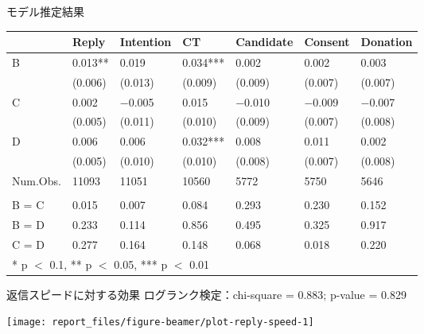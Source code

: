 \documentclass[
      aspectratio=169,
        12pt,
    ]{beamer}
\begin{document}
\begin{frame}{モデル推定結果}
\protect\hypertarget{ux30e2ux30c7ux30ebux63a8ux5b9aux7d50ux679c}{}
\begin{table}
\centering
\fontsize{9}{11}\selectfont
\begin{tabular}[t]{l>{\centering\arraybackslash}p{5em}>{\centering\arraybackslash}p{5em}>{\centering\arraybackslash}p{5em}>{\centering\arraybackslash}p{5em}>{\centering\arraybackslash}p{5em}>{\centering\arraybackslash}p{5em}}
\toprule
  & Reply & Intention & CT & Candidate & Consent & Donation\\
\midrule
B & \num{0.013}** & \num{0.019} & \num{0.034}*** & \num{0.002} & \num{0.002} & \num{0.003}\\
 & (\num{0.006}) & (\num{0.013}) & (\num{0.009}) & (\num{0.009}) & (\num{0.007}) & (\num{0.007})\\
C & \num{0.002} & \num{-0.005} & \num{0.015} & \num{-0.010} & \num{-0.009} & \num{-0.007}\\
 & (\num{0.005}) & (\num{0.011}) & (\num{0.010}) & (\num{0.009}) & (\num{0.007}) & (\num{0.008})\\
D & \num{0.006} & \num{0.006} & \num{0.032}*** & \num{0.008} & \num{0.011} & \num{0.002}\\
 & (\num{0.005}) & (\num{0.010}) & (\num{0.010}) & (\num{0.008}) & (\num{0.007}) & (\num{0.008})\\
\midrule
Num.Obs. & \num{11093} & \num{11051} & \num{10560} & \num{5772} & \num{5750} & \num{5646}\\
\addlinespace[0.3em]
\multicolumn{7}{l}{\textit{F-tests, p-value}}\\
\hspace{1em}B = C & \num{0.015} & \num{0.007} & \num{0.084} & \num{0.293} & \num{0.230} & \num{0.152}\\
\hspace{1em}B = D & \num{0.233} & \num{0.114} & \num{0.856} & \num{0.495} & \num{0.325} & \num{0.917}\\
\hspace{1em}C = D & \num{0.277} & \num{0.164} & \num{0.148} & \num{0.068} & \num{0.018} & \num{0.220}\\
\bottomrule
\multicolumn{7}{l}{\rule{0pt}{1em}* p $<$ 0.1, ** p $<$ 0.05, *** p $<$ 0.01}\\
\end{tabular}
\end{table}
\end{frame}

\begin{frame}{返信スピードに対する効果}
\protect\hypertarget{ux8fd4ux4fe1ux30b9ux30d4ux30fcux30c9ux306bux5bfeux3059ux308bux52b9ux679c}{}
ログランク検定：chi-square = 0.883; p-value = 0.829

\begin{center}\texttt{[image: report\_files/figure-beamer/plot-reply-speed-1]} \end{center}
\end{frame}
\end{document}
